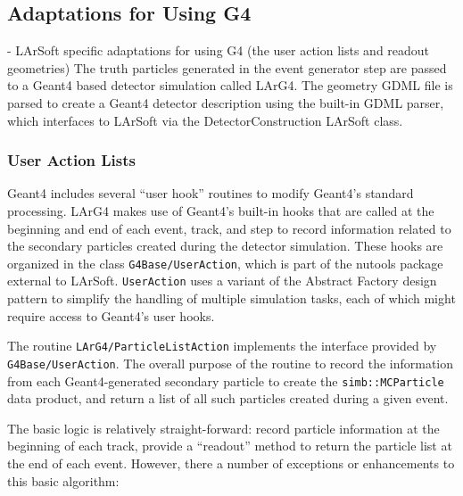 \documentclass[12pt]{elsarticle}
\begin{document}
\subsection{Adaptations for Using G4}
- LArSoft specific adaptations for using G4 (the user action lists and readout geometries)
The truth particles generated in the event generator step are passed to a Geant4 based detector simulation called LArG4.  The geometry GDML file is parsed to create a Geant4 detector description using the built-in GDML parser, which interfaces to LArSoft via the DetectorConstruction LArSoft class.

\subsubsection{User Action Lists}
\label{sec:useractions}
Geant4 includes several ``user hook'' routines to modify Geant4's
standard processing. LArG4 makes use of Geant4's built-in hooks that
are called at the beginning and end of each event, track, and step to
record information related to the secondary particles created during
the detector simulation. These hooks are organized in the class
{\tt G4Base/UserAction}, which is part of the nutools package external to
LArSoft. {\tt UserAction} uses a variant of the Abstract Factory design
pattern \cite{designpatterns} to simplify the handling of multiple
simulation tasks, each of which might require access to Geant4's user
hooks.

The routine {\tt LArG4/ParticleListAction} implements the interface provided
by {\tt G4Base/UserAction}. The overall purpose of the routine to record the
information from each Geant4-generated secondary particle to create
the {\tt simb::MCParticle} data product, and return a list of all such particles
created during a given event.

The basic logic is relatively straight-forward: record particle
information at the beginning of each track, provide a ``readout''
method to return the particle list at the end of each event. However,
there a number of exceptions or enhancements to this basic algorithm:
\end{document}
